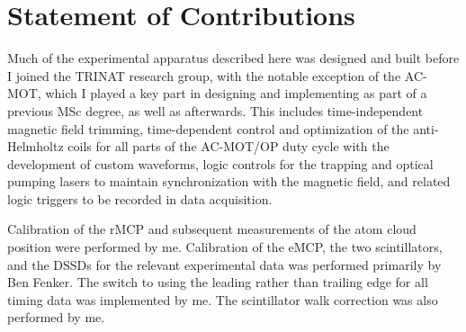 

\clearpage
\chapter{Statement of Contributions}
\label{ch:contributions}

%



Much of the experimental apparatus described here was designed and built before I joined the TRINAT research group, with the notable exception of the AC-MOT, which I played a key part in designing and implementing as part of a previous MSc degree\cite{thesis}, as well as afterwards.  This includes time-independent magnetic field trimming, time-dependent control and optimization of the anti-Helmholtz coils for all parts of the AC-MOT/OP duty cycle with the development of custom waveforms, logic controls for the trapping and optical pumping lasers to maintain synchronization with the magnetic field, and related logic triggers to be recorded in data acquisition.   

%

Calibration of the rMCP and subsequent measurements of the atom cloud position were performed by me.  Calibration of the eMCP, the two scintillators, and the DSSDs for the relevant experimental data was performed primarily by Ben Fenker.  The switch to using the leading rather than trailing edge for all timing data was implemented by me.  The scintillator walk correction was also performed by me.  


